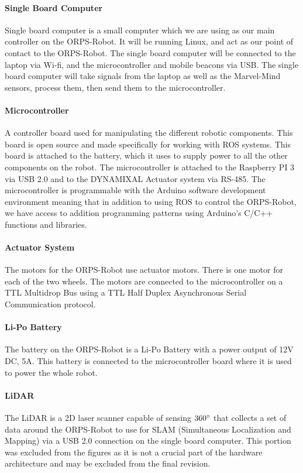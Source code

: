 \documentclass[english,12pt]{article}
\begin{document}
\paragraph{Single Board Computer}
Single board computer is a small computer which we are using as our main controller on the ORPS-Robot. It will be
running Linux, and act as our point of contact to the ORPS-Robot. The single board computer will be connected
to the laptop via Wi-fi, and the microcontroller and mobile beacons via USB. The single board computer will take signals
from the laptop as well as the Marvel-Mind sensors, process them, then send them to the microcontroller.
\paragraph{Microcontroller}
A controller board used for manipulating the different robotic components. This board is open
source and made specifically for working with ROS systems. This board is attached to the battery, which
it uses to supply power to all the other components on the robot. The microcontroller is attached to the
Raspberry PI 3 via USB 2.0 and to the DYNAMIXAL Actuator system via RS-485. The microcontroller is
programmable with the Arduino software development environment meaning that in addition to using
ROS to control the ORPS-Robot, we have access to addition programming patterns using Arduino’s
C/C++ functions and libraries.
\paragraph{Actuator System}
The motors for the ORPS-Robot use actuator motors. There is one motor for each of
the two wheels. The motors are connected to the microcontroller on a TTL Multidrop Bus using a TTL Half
Duplex Asynchronous Serial Communication protocol.
\paragraph{Li-Po Battery}
The battery on the ORPS-Robot is a Li-Po Battery with a power output of 12V DC, 5A. This battery is
connected to the microcontroller board where it is used to power the whole robot.
\paragraph{LiDAR}
The LiDAR is a 2D laser scanner capable of sensing $360\degree$ that collects a set of data around the ORPS-Robot
to use for SLAM (Simultaneous Localization and Mapping) via a USB 2.0 connection on the
single board computer. This portion was excluded from the figures as it is not a crucial part of the hardware
architecture and may be excluded from the final revision.
\end{document}
